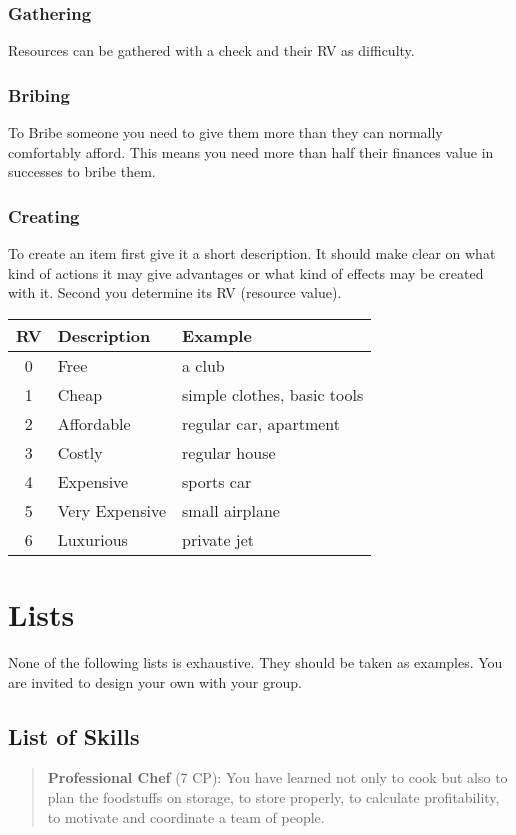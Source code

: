 \documentclass[11pt]{article}
\begin{document}
{\begin{multicols}{2}[]
\subsubsection{Gathering}
\label{sec:org3138b8c}
Resources can be gathered with a check and their RV as difficulty.

\subsubsection{Bribing}
\label{sec:org829fa9b}
To Bribe someone you need to give them more than they can normally comfortably afford. This means you need more than half their finances value in successes to bribe them.

\subsubsection{Creating}
\label{sec:org2f84ef7}
To create an item first give it a short description. It should make clear on what kind of actions it may give advantages or what kind of effects may be created with it. Second you determine its RV (resource value).

\begin{center}
\begin{tabular}{c|l|l}
\textbf{RV} & \textbf{Description} & \textbf{Example}\\
\hline
0 & Free & a club\\
1 & Cheap & simple clothes, basic tools\\
2 & Affordable & regular car, apartment\\
3 & Costly & regular house\\
4 & Expensive & sports car\\
5 & Very Expensive & small airplane\\
6 & Luxurious & private jet\\
\end{tabular}
\end{center}


\newpage
\section{Lists}
\label{sec:org0327007}
None of the following lists is exhaustive. They should be taken as examples. You are invited to design your own with your group.

\subsection{List of Skills}
\label{sec:orgd36bb2b}
\begin{quote}
\textbf{Professional Chef} (7 CP): You have learned not only to cook but also to plan the foodstuffs on storage, to store properly, to calculate profitability, to motivate and coordinate a team of people.
\end{quote}


\end{multicols}}
\end{document}
